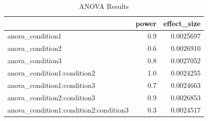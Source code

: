 \documentclass[]{book}
\begin{document}
\begin{table}[t]

\caption{\label{tab:unnamed-chunk-194}ANOVA Results}
\centering
\begin{tabular}{l|r|r}
\hline
  & power & effect\_size\\
\hline
anova\_condition1 & 0.9 & 0.0025697\\
\hline
anova\_condition2 & 0.6 & 0.0026910\\
\hline
anova\_condition3 & 0.8 & 0.0027052\\
\hline
anova\_condition1:condition2 & 1.0 & 0.0024255\\
\hline
anova\_condition1:condition3 & 0.7 & 0.0024663\\
\hline
anova\_condition2:condition3 & 0.9 & 0.0026853\\
\hline
anova\_condition1:condition2:condition3 & 0.3 & 0.0024517\\
\hline
\end{tabular}
\end{table}
\end{document}
